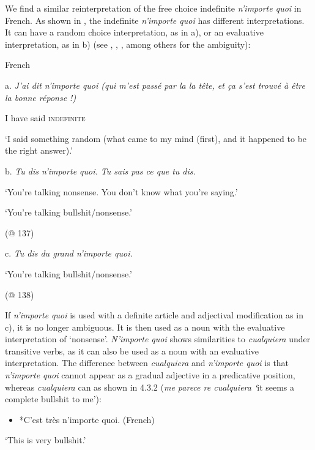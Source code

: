 \documentclass[output=paper]{langscibook}
\begin{document}
We find a similar reinterpretation of the free choice indefinite \textit{n’importe quoi} in French. As shown in , the indefinite \textit{n’importe quoi} has different interpretations. It can have a random choice interpretation, as in a), or an evaluative interpretation, as in b) (see \citealt{Larrivée2007}, \citealt{Paillard1998}, \citealt{Pescarini2009}, among others for the ambiguity):

\label{bkm:Ref62641804}  French

  a.  \textit{J’ai dit n’importe quoi (qui m’est passé par la la tête, et ça s’est trouvé à être la bonne réponse !)} 

I have said \textsc{indefinite}

‘I said something random (what came to my mind (first), and it happened to be the right answer).’

    \citep{Larrivée2007}

  b.  \textit{Tu dis n’importe quoi. Tu sais pas ce que tu dis.}

‘You’re talking nonsense. You don’t know what you’re saying.’

‘You’re talking bullshit/nonsense.’

    (@ 137)

  c.  \textit{Tu dis du grand n’importe quoi.}

‘You’re talking bullshit/nonsense.’

    (@ 138)

If \textit{n’importe quoi} is used with a definite article and adjectival modification as in c), it is no longer ambiguous. It is then used as a noun with the evaluative interpretation of ‘nonsense’. \textit{N’importe quoi} shows similarities to \textit{cualquiera} under transitive verbs, as it can also be used as a noun with an evaluative interpretation. The difference between \textit{cualquiera} and \textit{n’importe quoi} is that \textit{n’importe quoi} cannot appear as a gradual adjective in a predicative position, whereas \textit{cualquiera} can as shown in 4.3.2 (\textit{me parece re cualquiera ‘}it seems a complete bullshit to me’):

\begin{itemize}
\item \begin{styleListParagraph}
\textmd{       *C’est très n’importe quoi.                                     (French)}
\end{styleListParagraph}
\end{itemize}
\begin{styleListParagraph}
\textmd{‘This is very bullshit.’}
\end{styleListParagraph}
\end{document}
